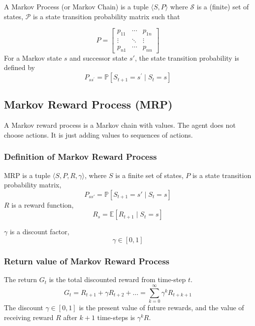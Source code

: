 \documentclass{article} %
\begin{document}
A Markov Process (or Markov Chain) is a tuple \(\langle S, P\rangle\) where 
  $\mathcal{S}$  is a (finite) set of states, 
  $\mathcal{P}$  is a state transition probability matrix
such that 

\[P = 
\begin{bmatrix}
p_{11} & \cdots & p_{1n} \\
\vdots & \ddots & \vdots \\
p_{n1} & \cdots & p_{nn}
\end{bmatrix}
\]
For a Markov state \( s \) and successor state \( s' \), the state transition probability is defined by
\[{P}_{s s^{\prime}}=\mathbb{P}\left[S_{t+1}=s^{\prime} \mid S_{t}=s\right]\]



\subsection{Markov Reward Process (MRP)}
A Markov reward process is a Markov chain with values. The agent does not choose actions. It is just adding values to sequences of actions. 

\subsubsection{Definition of Markov Reward Process}
MRP is a tuple \(\langle S, P, R, \gamma \rangle\), where
\(S\) is a finite set of states, \(P\) is a state transition probability matrix,
    \[
    P_{ss'} = \mathbb{P}[S_{t+1} = s' \mid S_t = s]
    \]
  \(R\) is a reward function,
    \[
    R_s = \mathbb{E}[R_{t+1} \mid S_t = s]
    \]
    
   \(\gamma\) is a discount factor,
    \[
    \gamma \in [0, 1]
    \]

\subsubsection{Return value of Markov Reward Process}
The return \( G_t \) is the total discounted reward from time-step \( t \).
\[
G_t = R_{t+1} + \gamma R_{t+2} + \ldots = \sum_{k=0}^\infty \gamma^k R_{t+k+1}
\]
The discount \( \gamma \in [0, 1] \) is the present value of future rewards, and the value of receiving reward \( R \) after \( k + 1 \) time-steps is \( \gamma^k R \).
\end{document}
